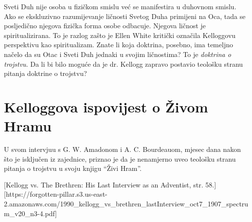 Sveti Duh nije osoba u fizičkom smislu već se manifestira u duhovnom smislu. Ako se ekskluzivno razumijevanje ličnosti Svetog Duha primijeni na Oca, tada se posljedično njegova fizička forma osobe odbacuje. Njegova ličnost je spiritualizirana. To je razlog zašto je Ellen White kritički označila Kelloggovu perspektivu kao spiritualizam. Znate li koja doktrina, posebno, ima temeljno načelo da su Otac i Sveti Duh jednaki u svojim ličnostima? To je \textit{doktrina o trojstvu}. Da li bi bilo moguće da je dr. Kellogg zapravo postavio teološku stranu pitanja doktrine o trojstvu?

\section*{Kelloggova ispovijest o Živom Hramu}

U svom intervjuu s G. W. Amadonom i A. C. Bourdeauom, mjesec dana nakon što je isključen iz zajednice, priznao je da je nenamjerno uveo teološku stranu pitanja o trojstvu u svoju knjigu “Živi Hram”.

[Kellogg vs. The Brethren: His Last Interview as an Adventist, str. 58.][https://forgotten-pillar.s3.us-east-2.amazonaws.com/1990\_kellogg\_vs\_brethren\_lastInterview\_oct7\_1907\_spectrum\_v20\_n3-4.pdf]

